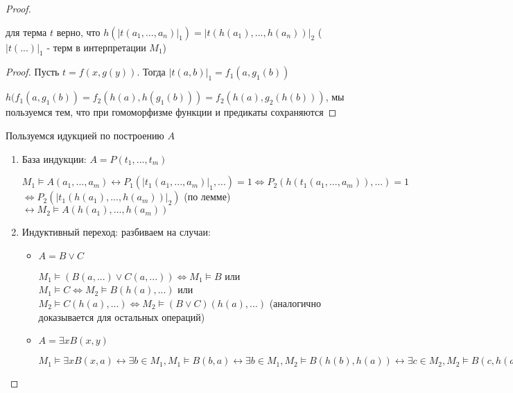 \documentclass{article}
\begin{document}
\begin{proof}
    \begin{lemma}
        для терма $t$ верно, что $h(|t(a_1,..., a_n)|_1) = |t(h(a_1),..., h(a_n))|_2$ ($|t(...)|_1$ - терм в интерпретации $M_1$)
    \end{lemma}
    
    \begin{proof}
        Пусть $t = f(x, g(y))$. Тогда $|t(a,b)|_1 = f_1(a, g_1(b))$
        
        $h(f_1(a, g_1(b)) = f_2(h(a), h(g_1(b))) = f_2(h(a), g_2(h(b)))$, мы пользуемся тем, что при гомоморфизме функции и предикаты сохраняются
    \end{proof}
    
    Пользуемся идукцией по построению $A$
    \begin{enumerate}
        \item База индукции: $A = P(t_1,..., t_m)$
        
        $M_1 \vDash A(a_1,...,a_m) \leftrightarrow P_1(|t_1(a_1,..., a_m)|_1,...) = 1 \Leftrightarrow P_2(h(t_1(a_1,..., a_m)),...) = 1$\\
        $\Leftrightarrow P_2(|t_1(h(a_1),..., h(a_m))|_2)$ (по лемме) $\leftrightarrow M_2 \vDash A(h(a_1),..., h(a_m))$
        
        \item Индуктивный переход: разбиваем на случаи:
        \begin{itemize}
            \item $A = B \vee C$
            
            $M_1 \vDash (B(a,...) \vee C(a,...)) \Leftrightarrow M_1 \vDash B$ или $M_1 \vDash C \Leftrightarrow M_2 \vDash B(h(a),...)$ или $M_2 \vDash C(h(a),...) \Leftrightarrow M_2 \vDash (B \vee C)(h(a),...)$ (аналогично доказывается для остальных операций)
            \item $A = \exists x B(x, y)$
            
            $M_1 \vDash \exists x B(x, a) \leftrightarrow \exists b \in M_1, M_1 \vDash B(b, a) \leftrightarrow \exists b \in M_1, M_2 \vDash B(h(b), h(a)) \leftrightarrow \exists c \in M_2, M_2 \vDash B(c, h(a))$
        \end{itemize}
    \end{enumerate}
\end{proof}
\end{document}

